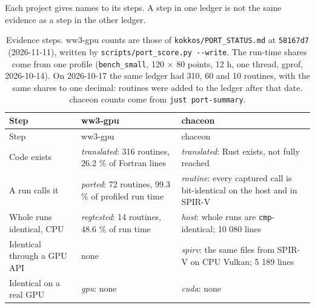 \documentclass[10pt,a4paper,]{article}
\begin{document}
Each project gives names to its steps. A step in one ledger is not the
same evidence as a step in the other ledger.

\begin{longtable}[]{@{}
  >{\raggedright\arraybackslash}p{}
  >{\raggedright\arraybackslash}p{}
  >{\raggedright\arraybackslash}p{}@{}}
\caption{\label{tbl:ladders}Evidence steps. ww3-gpu counts are those of
\texttt{kokkos/PORT\_STATUS.md} at \texttt{58167d7} (2026-11-11),
written by \texttt{scripts/port\_score.py\ -\/-write}. The run-time
shares come from one profile (\texttt{bench\_small}, 120 × 80 points, 12
h, one thread, gprof, 2026-10-14). On 2026-10-17 the same ledger had
310, 60 and 10 routines, with the same shares to one decimal: routines
were added to the ledger after that date. chaceon counts come from
\texttt{just\ port-summary}.}\tabularnewline
\toprule\noalign{}
\begin{minipage}[b]{\linewidth}\raggedright
Step
\end{minipage} & \begin{minipage}[b]{\linewidth}\raggedright
ww3-gpu
\end{minipage} & \begin{minipage}[b]{\linewidth}\raggedright
chaceon
\end{minipage} \\
\midrule\noalign{}
\endfirsthead
\toprule\noalign{}
\begin{minipage}[b]{\linewidth}\raggedright
Step
\end{minipage} & \begin{minipage}[b]{\linewidth}\raggedright
ww3-gpu
\end{minipage} & \begin{minipage}[b]{\linewidth}\raggedright
chaceon
\end{minipage} \\
\midrule\noalign{}
\endhead
\bottomrule\noalign{}
\endlastfoot
Code exists & \emph{translated}: 316 routines, 26.2 \% of Fortran lines
& \emph{translated}: Rust exists, not fully reached \\
A run calls it & \emph{ported}: 72 routines, 99.3 \% of profiled run
time & \emph{routine}: every captured call is bit-identical on the host
and in SPIR-V \\
Whole runs identical, CPU & \emph{regtested}: 14 routines, 48.6 \% of
run time & \emph{host}: whole runs are \texttt{cmp}-identical; 10 080
lines \\
Identical through a GPU API & none & \emph{spirv}: the same files from
SPIR-V on CPU Vulkan; 5 189 lines \\
Identical on a real GPU & \emph{gpu}: none & \emph{cuda}: none \\
\end{longtable}
\end{document}
